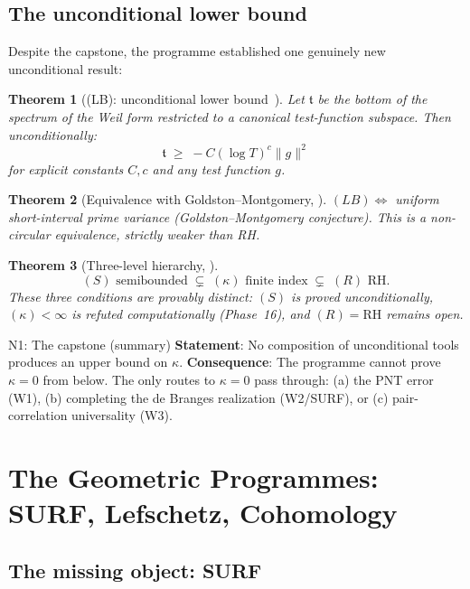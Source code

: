 \documentclass[11pt]{amsart}
\newtheorem{theorem}{Theorem}[section]
\theoremstyle{definition}
\theoremstyle{remark}
\newcommand{\RH}{\mathrm{RH}}
\newcommand{\kap}{\kappa}
\begin{document}
\subsection{The unconditional lower bound}

Despite the capstone, the programme established one genuinely new unconditional result:

\begin{theorem}[(LB): unconditional lower bound~\cite{RP17}]
\label{thm:LB}
Let $\mathfrak{t}$ be the bottom of the spectrum of the Weil form restricted to
a canonical test-function subspace.  Then unconditionally:
\[
  \mathfrak{t} \;\ge\; -C(\log T)^c \|g\|^2
\]
for explicit constants $C, c$ and any test function $g$.
\end{theorem}

\begin{theorem}[Equivalence with Goldston--Montgomery, \cite{RP17}]
$(LB) \Longleftrightarrow$ uniform short-interval prime variance (Goldston--Montgomery conjecture).
This is a non-circular equivalence, strictly weaker than RH.
\end{theorem}

\begin{theorem}[Three-level hierarchy, \cite{RP17}]
\[
  (S)\text{ semibounded} \;\subsetneq\; (\kap)\text{ finite index} \;\subsetneq\; (R)\text{ RH}.
\]
These three conditions are provably distinct: $(S)$ is proved unconditionally,
$(\kap) < \infty$ is refuted computationally (Phase~16), and $(R) = \RH$ remains open.
\end{theorem}

\begin{nogobox}{N1: The capstone (summary)}
\textbf{Statement}: No composition of unconditional tools produces an upper bound on $\kap$.
\textbf{Consequence}: The programme cannot prove $\kap=0$ from below.  The only routes
to $\kap=0$ pass through: (a) the PNT error (W1), (b) completing the de Branges realization
(W2/SURF), or (c) pair-correlation universality (W3).
\end{nogobox}

\section{The Geometric Programmes: SURF, Lefschetz, Cohomology}
\label{sec:geometric}

\subsection{The missing object: SURF}
\end{document}

